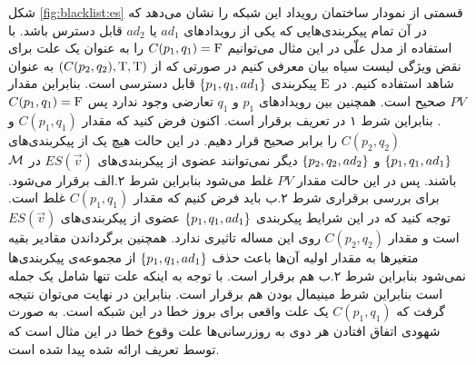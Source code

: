شکل
\ref{fig:blacklist:es}
قسمتی از نمودار ساختمان رویداد این شبکه را نشان می‌دهد که در آن تمام پیکر‌بندی‌هایی که یکی از رویداد‌های 
$ad_1$
یا
$ad_2$
قابل دسترس باشد.
با استفاده از مدل علّی در این مثال می‌توانیم
$C(p_1,q_1) = \mathrm{F}$
را به عنوان یک علت برای نقض ویژگی لیست سیاه بیان معرفی کنیم در صورتی که از
$(C(p_2,q_2),\mathrm{T},\mathrm{T})$
به عنوان شاهد استفاده کنیم.
در 
$\mathrm{E}$
پیکربندی 
$\{p_1,q_1,ad_1\}$
قابل دسترسی است.
بنابراین مقدار
$PV$
صحیح است.
همچنین بین رویداد‌های 
$p_1$
و
$q_1$
تعارضی وجود ندارد پس 
$C(p_1,q_1) = \mathrm{F}$.
بنابراین شرط ۱ در تعریف 
برقرار است.
اکنون فرض کنید که مقدار
$C(p_1,q_1)$
و
$C(p_2,q_2)$
را برابر صحیح قرار دهیم.
در این حالت هیچ یک از پیکر‌بندی‌های 
$\{p_1,q_1,ad_1\}$
و
$\{p_2,q_2,ad_2\}$
دیگر نمی‌توانند عضوی از پیکربندی‌های 
$ES(\vec v)$
در 
$\mathcal{M}$
باشند.
پس در این حالت مقدار
$PV$
غلط می‌شود بنابراین شرط 
۲.الف برقرار می‌شود.
برای بررسی برقراری شرط ۲.ب
باید فرض کنیم که مقدار
$C(p_1,q_1)$
غلط است.
توجه کنید که در این شرایط پیکربندی
$\{p_1,q_1,ad_1\}$
عضوی از پیکربندی‌های 
$ES(\vec v)$
است و مقدار
$C(p_2,q_2)$
روی این مساله تاثیری ندارد.
همچنین برگرداندن مقادیر بقیه متغیر‌ها به مقدار اولیه آن‌ها باعث حذف 
$\{p_1,q_1,ad_1\}$
از مجموعه‌ی پیکربندی‌ها نمی‌شود بنابراین شرط ۲.ب هم برقرار است.
با توجه به اینکه علت تنها شامل یک جمله است بنابراین شرط مینیمال بودن هم برقرار است.
بنابراین در نهایت می‌توان نتیجه گرفت که 
$C(p_1,q_1)$
یک علت واقعی برای بروز خطا در این شبکه است.
به صورت شهودی اتفاق افتادن هر دوی به روز‌رسانی‌ها علت وقوع خطا در این مثال است که توسط تعریف ارائه شده پیدا شده است.

